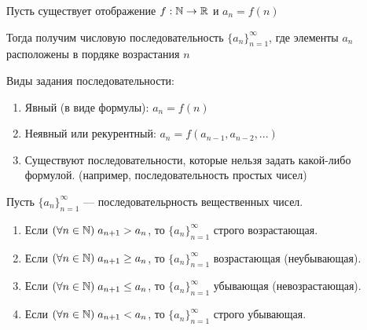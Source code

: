 \documentclass{article}
\begin{document}
Пусть существует отображение $f:\mathbb{N}\to\mathbb{R}$ и $a_{n}=f(n)$

Тогда получим числовую последовательность $\{a_{n}\}_{n=1}^{\infty}$, где элементы $a_{n}$ расположены в пордяке возрастания $n$

Виды задания последовательности:
\begin{enumerate}
	\item{}Явный (в виде формулы): $a_n=f(n)$
	\item{}Неявный или рекурентный: $a_n=f(a_{n-1}, a_{n-2}, ...)$
	\item{}Существуют последовательности, которые нельзя задать какой-либо формулой. (например, последовательность простых чисел)
\end{enumerate}

\pagebreak


Пусть $\{a_n\}^{\infty}_{n=1}$ --- последовательрность вещественных чисел.
\begin{enumerate}
	\item{} Если $(\forall n\in\mathbb{N})\;a_{n+1}>a_{n}$, то  $\{a_n\}^{\infty}_{n=1}$ строго возрастающая.
	\item{} Если $(\forall n\in\mathbb{N})\;a_{n+1} \geq a_{n}$, то  $\{a_n\}^{\infty}_{n=1}$ возрастающая (неубывающая).
	\item{} Если $(\forall n\in\mathbb{N})\;a_{n+1} \leq a_{n}$, то  $\{a_n\}^{\infty}_{n=1}$ убывающая (невозрастающая).
	\item{} Если $(\forall n\in\mathbb{N})\;a_{n+1}<a_{n}$, то  $\{a_n\}^{\infty}_{n=1}$ строго убывающая.
\end{enumerate}
\end{document}
